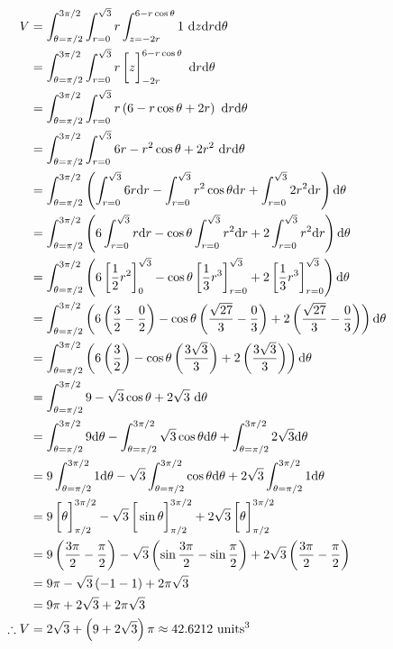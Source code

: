 \documentclass[a4paper,12pt]{report}
\begin{document}
\begin{align*}
  V &= \int_{\theta=\pi/2}^{3\pi/2}\int_{r=0}^{\sqrt{3}}r\int_{z=-2r}^{6-r\cos\theta} 1\ \d z\d r\d\theta \\
    &= \int_{\theta=\pi/2}^{3\pi/2}\int_{r=0}^{\sqrt{3}}r \sqbracks{\vphantom{\frac{1}{2}}z}_{-2r}^{6-r\cos\theta}\ \d r\d\theta \\
    &= \int_{\theta=\pi/2}^{3\pi/2}\int_{r=0}^{\sqrt{3}}r \bracks{6-r\cos\theta + 2r}\ \d r\d\theta \\
    &= \int_{\theta=\pi/2}^{3\pi/2}\int_{r=0}^{\sqrt{3}} 6r - r^2\cos\theta + 2r^2\ \d r\d\theta \\
    &= \int_{\theta=\pi/2}^{3\pi/2}\bracks{
      \int_{r=0}^{\sqrt{3}} 6r\d r - 
      \int_{r=0}^{\sqrt{3}}r^2\cos\theta\d r +
      \int_{r=0}^{\sqrt{3}}2r^2\d r
    }\d\theta \\
    &= \int_{\theta=\pi/2}^{3\pi/2}\bracks{
      6\int_{r=0}^{\sqrt{3}} r\d r - 
      \cos\theta\int_{r=0}^{\sqrt{3}}r^2\d r +
      2\int_{r=0}^{\sqrt{3}}r^2\d r
    }\d\theta \\
    &= \int_{\theta=\pi/2}^{3\pi/2}\bracks{
      6\sqbracks{\frac{1}{2}r^2}_{0}^{\sqrt{3}} - 
      \cos\theta\sqbracks{\frac{1}{3}r^3}_{r=0}^{\sqrt{3}} +
      2\sqbracks{\frac{1}{3}r^3}_{r=0}^{\sqrt{3}}
    }\d\theta \\
    &= \int_{\theta=\pi/2}^{3\pi/2}\bracks{
      6\bracks{\frac{3}{2} - \frac{0}{2}} - 
      \cos\theta\bracks{\frac{\sqrt{27}}{3} - \frac{0}{3}} +
      2\bracks{\frac{\sqrt{27}}{3} - \frac{0}{3}}
    }\d\theta \\
    &= \int_{\theta=\pi/2}^{3\pi/2}\bracks{
      6\bracks{\frac{3}{2}} - 
      \cos\theta\bracks{\frac{3\sqrt{3}}{3}} +
      2\bracks{\frac{3\sqrt{3}}{3}}
    }\d\theta \\
    &= \int_{\theta=\pi/2}^{3\pi/2}9 - \sqrt{3}\cos\theta + 2\sqrt{3}\ \d\theta \\
    &= \int_{\theta=\pi/2}^{3\pi/2}9\d\theta - \int_{\theta=\pi/2}^{3\pi/2}\sqrt{3}\cos\theta\d\theta + \int_{\theta=\pi/2}^{3\pi/2}2\sqrt{3}\d\theta \\
    &= 9\int_{\theta=\pi/2}^{3\pi/2}1\d\theta - \sqrt{3}\int_{\theta=\pi/2}^{3\pi/2}\cos\theta\d\theta + 2\sqrt{3}\int_{\theta=\pi/2}^{3\pi/2}1\d\theta \\
    &= 9\sqbracks{\vphantom{\frac{1}{2}}\theta}_{\pi/2}^{3\pi/2} - \sqrt{3}\sqbracks{\vphantom{\frac{1}{2}}\sin\theta}_{\pi/2}^{3\pi/2} + 2\sqrt{3}\sqbracks{\vphantom{\frac{1}{2}}\theta}_{\pi/2}^{3\pi/2} \\
    &= 9\bracks{\frac{3\pi}{2} - \frac{\pi}{2}} - \sqrt{3}\bracks{\sin\frac{3\pi}{2} - \sin\frac{\pi}{2}} + 2\sqrt{3}\bracks{\frac{3\pi}{2} - \frac{\pi}{2}} \\
    &= 9\pi - \sqrt{3}\bracks{-1 - 1} + 2\pi\sqrt{3} \\
    &= 9\pi + 2\sqrt{3} + 2\pi\sqrt{3} \\
  \tf V &= 2\sqrt{3} + \bracks{9 + 2\sqrt{3}}\pi \approx 42.6212\text{ units}^3 \\
\end{align*}
\end{document}
